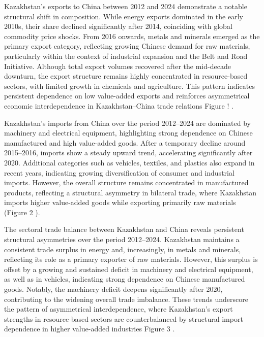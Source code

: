 \documentclass[12pt]{article}
\begin{document}
Kazakhstan’s exports to China between 2012 and 2024 demonstrate a notable structural shift in composition. While energy exports dominated in the early 2010s, their share declined significantly after 2014, coinciding with global commodity price shocks. From 2016 onwards, metals and minerals emerged as the primary export category, reflecting growing Chinese demand for raw materials, particularly within the context of industrial expansion and the Belt and Road Initiative. Although total export volumes recovered after the mid-decade downturn, the export structure remains highly concentrated in resource-based sectors, with limited growth in chemicals and agriculture. This pattern indicates persistent dependence on low value-added exports and reinforces asymmetrical economic interdependence in Kazakhstan--China trade relations Figure ! .\par

Kazakhstan’s imports from China over the period 2012--2024 are dominated by machinery and electrical equipment, highlighting strong dependence on Chinese manufactured and high value-added goods. After a temporary decline around 2015--2016, imports show a steady upward trend, accelerating significantly after 2020. Additional categories such as vehicles, textiles, and plastics also expand in recent years, indicating growing diversification of consumer and industrial imports. However, the overall structure remains concentrated in manufactured products, reflecting a structural asymmetry in bilateral trade, where Kazakhstan imports higher value-added goods while exporting primarily raw materials (Figure 2 ).\par

The sectoral trade balance between Kazakhstan and China reveals persistent structural asymmetries over the period 2012--2024. Kazakhstan maintains a consistent trade surplus in energy and, increasingly, in metals and minerals, reflecting its role as a primary exporter of raw materials. However, this surplus is offset by a growing and sustained deficit in machinery and electrical equipment, as well as in vehicles, indicating strong dependence on Chinese manufactured goods. Notably, the machinery deficit deepens significantly after 2020, contributing to the widening overall trade imbalance. These trends underscore the pattern of asymmetrical interdependence, where Kazakhstan’s export strengths in resource-based sectors are counterbalanced by structural import dependence in higher value-added industries Figure 3 .\par
\end{document}

